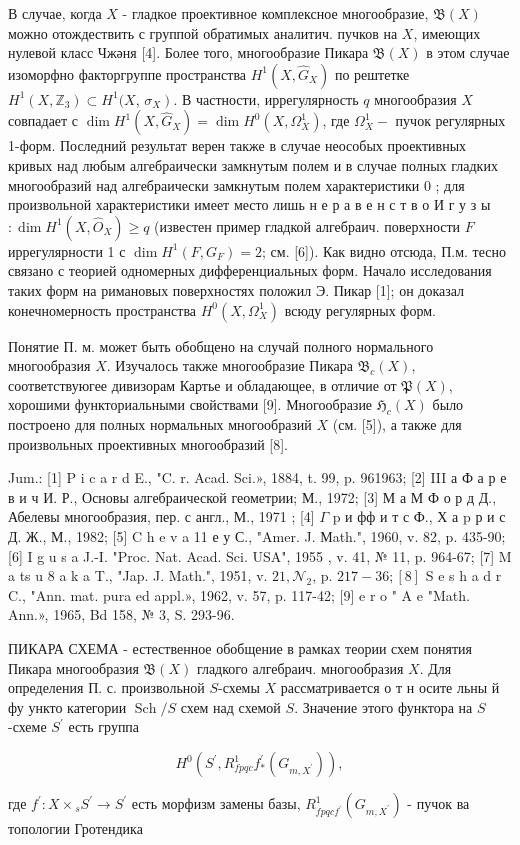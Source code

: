 \documentclass[10pt]{article}
\begin{document}
В случае, когда $X$ - гладкое проективное комплексное многообразие, $\mathfrak{B}(X)$ можно отождествить с группой обратимых аналитич. пучков на $X$, имеющих нулевой класс Чжәня [4]. Более того, многообразие Пикара $\mathfrak{B}(X)$ в этом случае изоморфно факторгруппе пространства $H^{1}\left(X, \widehat{G}_{X}\right)$ по рештетке $H^{1}\left(X, \mathbb{Z}_{3}\right) \subset H^{1}(X$, $\left.\sigma_{X}\right)$. В частности, иррегулярность $q$ многообразия $X$ совпадает с $\operatorname{dim} H^{1}\left(X, \hat{G}_{X}\right)=\operatorname{dim} H^{0}\left(X, \Omega_{X}^{1}\right)$, где $\Omega_{X}^{1}-$ пучок регулярных 1-форм. Последний результат верен также в случае неособых проективных кривых над любым алгебраически замкнутым полем и в случае полных гладких многообразий над алгебраически замкнутым полем характеристики 0 ; для произвольной характеристики имеет место лишь н е р а в е н с т в о И г у з ы $: \operatorname{dim} H^{1}\left(X, \widehat{O}_{X}\right) \geqslant q$ (известен пример гладкой алгебраич. поверхности $F$ иррегулярности 1 с $\operatorname{dim} H^{1}\left(F, G_{F}\right)=2$; см. [6]). Как видно отсюда, П.м. тесно связано с теорией одномерных дифференциальных форм. Начало исследования таких форм на римановых поверхностях положил Э. Пикар [1]; он доказал конечномерность пространства $H^{0}\left(X, \Omega_{X}^{1}\right)$ всюду регулярных форм.

Понятие П. м. может быть обобщено на случай полного нормального многообразия $X$. Изучалось также многообразие Пикара $\mathfrak{B}_{c}(X)$, соответствуюгее дивизорам Картье и обладающее, в отличие от $\mathfrak{P}(X)$, хорошими функториальными свойствами [9]. Многообразие $\mathfrak{H}_{c}(X)$ было построено для полных нормальных многообразий $X$ (см. [5]), а также для произвольных проективных многообразий [8].

Jum.: [1] P i c a r d E., "C. r. Acad. Sci.», 1884, t. 99, p. 961963; [2] III а Ф а р е в и ч И. Р., Основы алгебраической геометрии; М., 1972; [3] М а М Ф о р д Д., Абелевы многообразия, пер. с англ., М., 1971 ; [4] $\Gamma$ p и фф и т с Ф., Х а p р и с Д. Ж., М., 1982; [5] C h e v a 11 е у С., "Amer. J. Мath.", 1960, v. 82, p. 435-90; [6] I g u s a J.-I. "Proc. Nat. Acad. Sci. USA", 1955 , v. 41, № 11, p. 964-67; [7] M a ts u 8 a k a T., "Jap. J. Math.",
1951, v. $21, \mathcal{N}_{2}$, p. $217-36 ;[8]$ S e s h a d r C., "Ann. mat. pura ed appl.», 1962, v. 57, p. 117-42; [9] e r o " A e "Math. Ann.», 1965, Bd 158, № 3, S. 293-96.

ПИКАРА СХЕМА - естественное обобщение в рамках теории схем понятия Пикара многообразия $\mathfrak{B}(X)$ гладкого алгебраич. многообразия $X$. Для определения П. с. произвольной $S$-схемы $X$ рассматривается о т н осите льны й фу ункто категории $\operatorname{Sch} / S$ схем над схемой $S$. Значение этого функтора на $S$-схеме $S^{\prime}$ есть группа

\[
H^{0}\left(S^{\prime}, R_{f p q c}^{1} f_{*}^{\prime}\left(G_{m, X^{\prime}}\right)\right),
\]

где $f^{\prime}: X \times{ }_{s} S^{\prime} \rightarrow S^{\prime}$ есть морфизм замены базы, $R_{f p q c f^{\prime}}^{1}\left(G_{m, X^{\prime}}\right)$ - пучок ва топологии Гротендика
\end{document}
